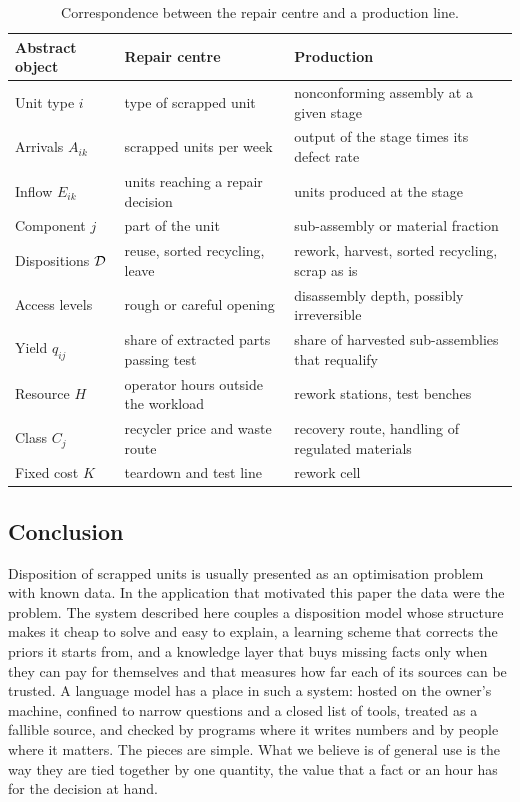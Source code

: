 \begin{table}[H]
\centering\small
\caption{Correspondence between the repair centre and a production line.}\label{tab:production}
\begin{tabular}{p{}p{}p{}}
\toprule
Abstract object & Repair centre & Production \\
\midrule
Unit type $i$ & type of scrapped unit & nonconforming assembly at a given stage \\
Arrivals $A_{ik}$ & scrapped units per week & output of the stage times its defect rate \\
Inflow $E_{ik}$ & units reaching a repair decision & units produced at the stage \\
Component $j$ & part of the unit & sub-assembly or material fraction \\
Dispositions $\mathcal{D}$ & reuse, sorted recycling, leave & rework, harvest, sorted recycling, scrap as is \\
Access levels & rough or careful opening & disassembly depth, possibly irreversible \\
Yield $q_{ij}$ & share of extracted parts passing test & share of harvested sub-assemblies that requalify \\
Resource $H$ & operator hours outside the workload & rework stations, test benches \\
Class $C_j$ & recycler price and waste route & recovery route, handling of regulated materials \\
Fixed cost $K$ & teardown and test line & rework cell \\
\bottomrule
\end{tabular}
\end{table}

\subsection{Conclusion}

Disposition of scrapped units is usually presented as an optimisation problem with known data. In the application
that motivated this paper the data were the problem. The system described here couples a disposition model whose
structure makes it cheap to solve and easy to explain, a learning scheme that corrects the priors it starts from,
and a knowledge layer that buys missing facts only when they can pay for themselves and that measures how far each
of its sources can be trusted. A language model has a place in such a system: hosted on the owner's machine,
confined to narrow questions and a closed list of tools, treated as a fallible source, and checked by programs
where it writes numbers and by people where it matters. The pieces are simple. What we believe is of general use is
the way they are tied together by one quantity, the value that a fact or an hour has for the decision at hand.

